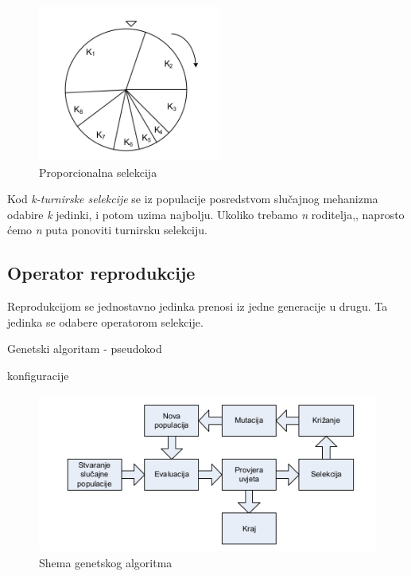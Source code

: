 \documentclass[times, utf8, zavrsni, numeric]{fer}
\begin{document}
\begin{figure}[htb]
\centering
\includegraphics[width=6cm]{img/selekcija.png}
\caption{Proporcionalna selekcija}
\label{fig:selekcija}
\end{figure}

Kod \emph{k-turnirske selekcije} se iz populacije posredstvom slučajnog mehanizma odabire \emph{k} jedinki, i potom uzima najbolju. Ukoliko trebamo \emph{n} roditelja,, naprosto ćemo \emph{n} puta ponoviti turnirsku selekciju.

\subsection{Operator reprodukcije}
Reprodukcijom se jednostavno jedinka prenosi iz jedne generacije u drugu. Ta jedinka se odabere operatorom selekcije.

\begin{algorithm}
\caption{Genetski algoritam - pseudokod}
\label{alg:genetski}
\begin{algorithmic}
\REPEAT
{}
konfiguracije
\ENDWHILE
{}
\end{algorithmic}
\end{algorithm}

\begin{figure}[htb]
\centering
\includegraphics[width=12cm]{img/genetski_shema.png}
\caption{Shema genetskog algoritma}
\label{fig:genetski_shema}
\end{figure}
\end{document}
